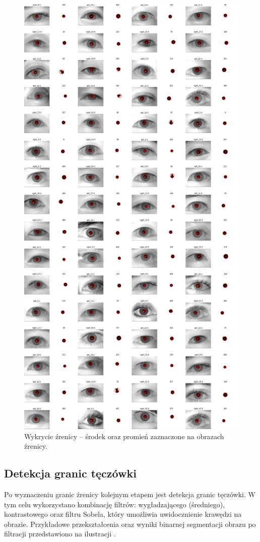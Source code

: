 \documentclass[a4paper]{article}
\begin{document}
\begin{figure}[H]
    \centering
    \includegraphics[width=0.9\linewidth]{figures/pupils_detected_many.png}
    \caption{Wykrycie źrenicy – środek oraz promień zaznaczone na obrazach źrenicy.}
    \label{fig:pupils_detected_many}
\end{figure}

\subsection{Detekcja granic tęczówki}
Po wyznaczeniu granic źrenicy kolejnym etapem jest detekcja granic tęczówki. W tym celu wykorzystano kombinację filtrów: wygładzającego (średniego), kontrastowego oraz filtru Sobela, który umożliwia uwidocznienie krawędzi na obrazie. Przykładowe przekształcenia oraz wyniki binarnej segmentacji obrazu po filtracji przedstawiono na ilustracji .
\end{document}

